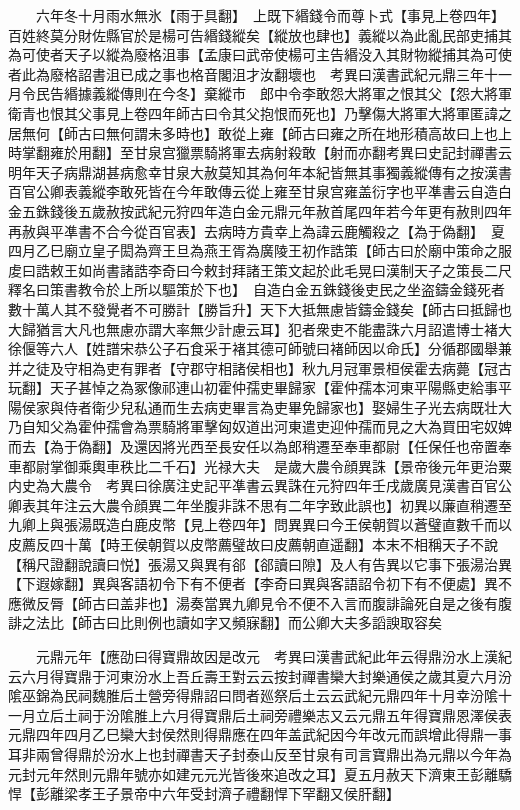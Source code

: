　　六年冬十月雨水無氷【雨于具翻】　上既下緡錢令而尊卜式【事見上卷四年】百姓終莫分財佐縣官於是楊可告緡錢縱矣【縱放也肆也】義縱以為此亂民部吏捕其為可使者天子以縱為廢格沮事【孟康曰武帝使楊可主告緡没入其財物縱捕其為可使者此為廢格詔書沮已成之事也格音閣沮才汝翻壞也　考異曰漢書武紀元鼎三年十一月令民告緡據義縱傳則在今冬】棄縱市　郎中令李敢怨大將軍之恨其父【怨大將軍衛青也恨其父事見上卷四年師古曰令其父抱恨而死也】乃擊傷大將軍大將軍匿諱之居無何【師古曰無何謂未多時也】敢從上雍【師古曰雍之所在地形積高故曰上也上時掌翻雍於用翻】至甘泉宫獵票騎將軍去病射殺敢【射而亦翻考異曰史記封禪書云明年天子病鼎湖甚病愈幸甘泉大赦莫知其為何年本紀皆無其事獨義縱傳有之按漢書百官公卿表義縱李敢死皆在今年敢傳云從上雍至甘泉宫雍盖衍字也平凖書云自造白金五銖錢後五歲赦按武紀元狩四年造白金元鼎元年赦首尾四年若今年更有赦則四年再赦與平凖書不合今從百官表】去病時方貴幸上為諱云鹿觸殺之【為于偽翻】　夏四月乙巳廟立皇子閎為齊王旦為燕王胥為廣陵王初作誥策【師古曰於廟中策命之服䖍曰誥敕王如尚書諸誥李奇曰今敕封拜諸王策文起於此毛晃曰漢制天子之策長二尺釋名曰策書教令於上所以驅策於下也】　自造白金五銖錢後吏民之坐盗鑄金錢死者數十萬人其不發覺者不可勝計【勝旨升】天下大抵無慮皆鑄金錢矣【師古曰抵歸也大歸猶言大凡也無慮亦謂大率無少計慮云耳】犯者衆吏不能盡誅六月詔遣博士褚大徐偃等六人【姓譜宋恭公子石食采于褚其德可師號曰褚師因以命氏】分循郡國舉兼并之徒及守相為吏有罪者【守郡守相諸侯相也】秋九月冠軍景桓侯霍去病薨【冠古玩翻】天子甚悼之為冢像祁連山初霍仲孺吏畢歸家【霍仲孺本河東平陽縣吏給事平陽侯家與侍者衛少兒私通而生去病吏畢言為吏畢免歸家也】娶婦生子光去病既壮大乃自知父為霍仲孺會為票騎將軍擊匈奴道出河東遣吏迎仲孺而見之大為買田宅奴婢而去【為于偽翻】及還因將光西至長安任以為郎稍遷至奉車都尉【任保任也帝置奉車都尉掌御乘輿車秩比二千石】光禄大夫　是歲大農令顔異誅【景帝後元年更治粟内史為大農令　考異曰徐廣注史記平凖書云異誅在元狩四年壬戌歲廣見漢書百官公卿表其年注云大農令顔異二年坐腹非誅不思有二年字致此誤也】初異以廉直稍遷至九卿上與張湯既造白鹿皮幣【見上卷四年】問異異曰今王侯朝賀以蒼璧直數千而以皮薦反四十萬【時王侯朝賀以皮幣薦璧故曰皮薦朝直遥翻】本末不相稱天子不說【稱尺證翻說讀曰悦】張湯又與異有郤【郤讀曰隙】及人有告異以它事下張湯治異【下遐嫁翻】異與客語初令下有不便者【李奇曰異與客語詔令初下有不便處】異不應微反脣【師古曰盖非也】湯奏當異九卿見令不便不入言而腹誹論死自是之後有腹誹之法比【師古曰比則例也讀如字又頻寐翻】而公卿大夫多謟諛取容矣

　　元鼎元年【應劭曰得寶鼎故因是改元　考異曰漢書武紀此年云得鼎汾水上漢紀云六月得寶鼎于河東汾水上吾丘壽王對云云按封禪書欒大封樂通侯之歲其夏六月汾隂巫錦為民祠魏脽后土營旁得鼎詔曰問者廵祭后土云云武紀元鼎四年十月幸汾隂十一月立后土祠于汾隂脽上六月得寶鼎后土祠旁禮樂志又云元鼎五年得寶鼎恩澤侯表元鼎四年四月乙巳欒大封侯然則得鼎應在四年盖武紀因今年改元而誤增此得鼎一事耳非兩曾得鼎於汾水上也封禪書天子封泰山反至甘泉有司言寶鼎出為元鼎以今年為元封元年然則元鼎年號亦如建元元光皆後來追改之耳】夏五月赦天下濟東王彭離驕悍【彭離梁孝王子景帝中六年受封濟子禮翻悍下罕翻又侯肝翻】


